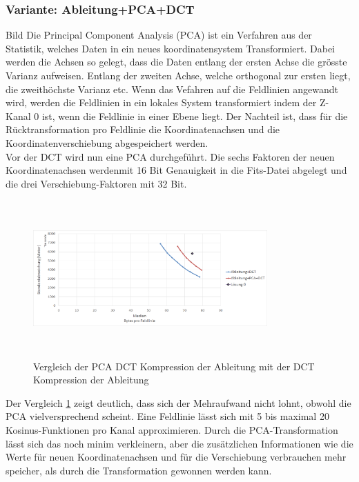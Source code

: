 \subsubsection{Variante: Ableitung+PCA+DCT}
Bild
Die Principal Component Analysis (PCA)\cite{abdi2010principal} ist ein Verfahren aus der Statistik, welches Daten in ein neues koordinatensystem Transformiert. Dabei werden die Achsen so gelegt, dass die Daten entlang der ersten Achse die grösste Varianz aufweisen. Entlang der zweiten Achse, welche orthogonal zur ersten liegt, die zweithöchste Varianz etc. Wenn das Vefahren auf die Feldlinien angewandt wird, werden die Feldlinien in ein lokales System transformiert indem der Z-Kanal 0 ist, wenn die Feldlinie in einer Ebene liegt. Der Nachteil ist, dass für die Rücktransformation pro Feldlinie die Koordinatenachsen und die Koordinatenverschiebung abgespeichert werden.\\
Vor der DCT wird nun eine PCA durchgeführt. Die sechs Faktoren der neuen Koordinatenachsen werdenmit  16 Bit Genauigkeit in die Fits-Datei abgelegt und die drei Verschiebung-Faktoren mit 32 Bit.
\begin{figure}[!htbp]
	\center
	\includegraphics[width=0.8\textwidth,height=6cm,keepaspectratio]{./pictures/resultate/loesung1/loesung1-4/loesung1_4.png}
	\caption{Vergleich der PCA DCT Kompression der Ableitung mit der DCT Kompression der Ableitung}
	\label{resultate:loesung1:dct:pca}
\end{figure}
Der Vergleich \ref{resultate:loesung1:dct:pca} zeigt deutlich, dass sich der Mehraufwand nicht lohnt, obwohl die PCA vielversprechend scheint. Eine Feldlinie lässt sich mit 5 bis maximal 20 Kosinus-Funktionen pro Kanal approximieren. Durch die PCA-Transformation lässt sich das noch minim verkleinern, aber die zusätzlichen Informationen wie die Werte für neuen Koordinatenachsen und für die Verschiebung verbrauchen mehr speicher, als durch die Transformation gewonnen werden kann.\\
